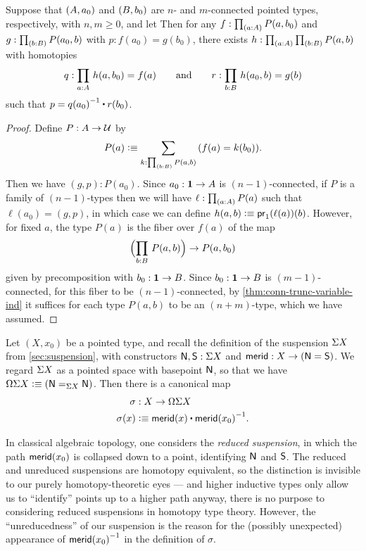 \begin{lem}\label{thm:wedge-connectivity}
  Suppose that $\pairr{A,a_0}$ and $\pairr{B,b_0}$ are $n$- and $m$-connected pointed types, respectively, with $n,m\geq0$, and let 
%
%
Then for any ${f:\prd{a:A} P(a,b_0)}$ and ${g:\prd{b:B} P(a_0,b)}$ with $p:f(a_0) = g(b_0)$, there exists $h:\prd{a:A}{b:B} P(a,b)$ with homotopies
%
\begin{equation*}
  q:\prd{a:A} h(a,b_0)=f(a)
  \qquad\text{and}\qquad
  r:\prd{b:B} h(a_0,b)=g(b)
 \end{equation*}
%
such that $p = \opp{q(a_0)} \ct r(b_0)$.
\end{lem}
\begin{proof}
  Define $P:A\to\type$ by
  \[ P(a) \defeq \sm{k:\prd{b:B} P(a,b)} (f(a) = k(b_0)). \]
  Then we have $(g,p):P(a_0)$.
  Since $a_0:\unit\to A$ is $(n-1)$-connected, if $P$ is a family of $(n-1)$-types then we will have $\ell:\prd{a:A} P(a)$ such that $\ell(a_0) = (g,p)$, in which case we can define $h(a,b) \defeq \proj1(\ell(a))(b)$.
  However, for fixed $a$, the type $P(a)$ is the fiber over $f(a)$ of the map
  \[ \Parens{\prd{b:B} P(a,b) } \to P(a,b_0) \]
  given by precomposition with $b_0:\unit\to B$.
  Since $b_0:\unit\to B$ is $(m-1)$-connected, for this fiber to be $(n-1)$-connected, by \autoref{thm:conn-trunc-variable-ind} it suffices for each type $P(a,b)$ to be an $(n+m)$-type, which we have assumed.
\end{proof}

Let $(X,x_0)$ be a pointed type, and recall the definition of the suspension $\susp X$ from \autoref{sec:suspension}, with constructors $\north,\south:\susp X$ and $\merid:X \to (\north=\south)$.
We regard $\susp X$ as a pointed space with basepoint $\north$, so that we have $\Omega\susp X \defeq (\id[\susp X]\north\north)$.
Then there is a canonical map
\begin{align*}
  \sigma &: X \to \Omega\susp X\\
  \sigma(x) &\defeq \merid(x) \ct \opp{\merid(x_0)}.
\end{align*}

\begin{rmk}
  In classical algebraic topology, one considers the \emph{reduced suspension}, in which the path $\merid(x_0)$ is collapsed down to a point, identifying $\north$ and $\south$.
  The reduced and unreduced suspensions are homotopy equivalent, so the distinction is invisible to our purely homotopy-theoretic eyes --- and higher inductive types only allow us to ``identify'' points up to a higher path anyway, there is no purpose to considering reduced suspensions in homotopy type theory.
  However, the ``unreducedness'' of our suspension is the reason for the (possibly unexpected) appearance of $\opp{\merid(x_0)}$ in the definition of $\sigma$.
\end{rmk}

